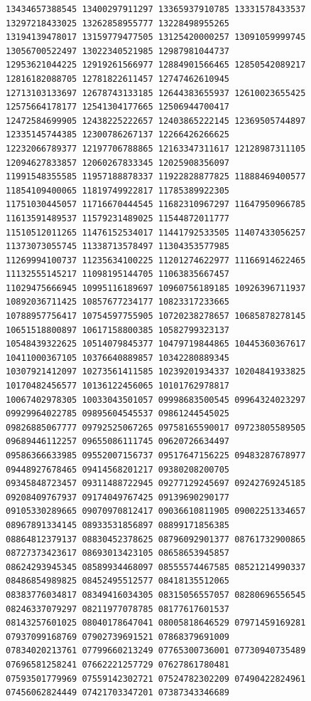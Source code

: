 \documentclass[10pt]{article}
\begin{document}
\begin{verbatim}
13434657388545 13400297911297 13365937910785 13331578433537 13297218433025 13262858955777 13228498955265
13194139478017 13159779477505 13125420000257 13091059999745 13056700522497 13022340521985 12987981044737
12953621044225 12919261566977 12884901566465 12850542089217 12816182088705 12781822611457 12747462610945
12713103133697 12678743133185 12644383655937 12610023655425 12575664178177 12541304177665 12506944700417
12472584699905 12438225222657 12403865222145 12369505744897 12335145744385 12300786267137 12266426266625
12232066789377 12197706788865 12163347311617 12128987311105 12094627833857 12060267833345 12025908356097
11991548355585 11957188878337 11922828877825 11888469400577 11854109400065 11819749922817 11785389922305
11751030445057 11716670444545 11682310967297 11647950966785 11613591489537 11579231489025 11544872011777
11510512011265 11476152534017 11441792533505 11407433056257 11373073055745 11338713578497 11304353577985
11269994100737 11235634100225 11201274622977 11166914622465 11132555145217 11098195144705 11063835667457
11029475666945 10995116189697 10960756189185 10926396711937 10892036711425 10857677234177 10823317233665
10788957756417 10754597755905 10720238278657 10685878278145 10651518800897 10617158800385 10582799323137
10548439322625 10514079845377 10479719844865 10445360367617 10411000367105 10376640889857 10342280889345
10307921412097 10273561411585 10239201934337 10204841933825 10170482456577 10136122456065 10101762978817
10067402978305 10033043501057 09998683500545 09964324023297 09929964022785 09895604545537 09861244545025
09826885067777 09792525067265 09758165590017 09723805589505 09689446112257 09655086111745 09620726634497
09586366633985 09552007156737 09517647156225 09483287678977 09448927678465 09414568201217 09380208200705
09345848723457 09311488722945 09277129245697 09242769245185 09208409767937 09174049767425 09139690290177
09105330289665 09070970812417 09036610811905 09002251334657 08967891334145 08933531856897 08899171856385
08864812379137 08830452378625 08796092901377 08761732900865 08727373423617 08693013423105 08658653945857
08624293945345 08589934468097 08555574467585 08521214990337 08486854989825 08452495512577 08418135512065
08383776034817 08349416034305 08315056557057 08280696556545 08246337079297 08211977078785 08177617601537
08143257601025 08040178647041 08005818646529 07971459169281 07937099168769 07902739691521 07868379691009
07834020213761 07799660213249 07765300736001 07730940735489 07696581258241 07662221257729 07627861780481
07593501779969 07559142302721 07524782302209 07490422824961 07456062824449 07421703347201 07387343346689

\end{verbatim}
\end{document}
